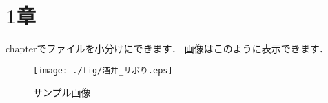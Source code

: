 \section{1章}
chapterでファイルを小分けにできます．
画像はこのように表示できます．
\begin{figure}[tbp]
  \centering
  \texttt{[image: ./fig/酒井\_サボり.eps]}
  \vspace{-5pt}
  \caption{サンプル画像}
  \label{fig:sample}
  \end{figure}